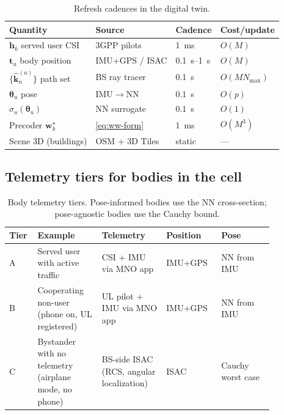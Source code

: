 \documentclass[journal,twoside,onecolumn]{IEEEtran}
\theoremstyle{definition}
\newcommand{\khat}{\hat{\bm{k}}}
\newcommand{\ww}{\mathbf{w}}
\newcommand{\hh}{\mathbf{h}}
\begin{document}
\begin{table}[!t]
\centering
\caption{Refresh cadences in the digital twin.}
\label{tab:cadence}
\begin{tabular}{@{}llll@{}}
\toprule
Quantity & Source & Cadence & Cost/update\\
\midrule
$\hh_k$ served user CSI      & 3GPP pilots    & \SI{1}{ms}   & $O(M)$\\
$\mathbf{t}_u$ body position  & IMU+GPS / ISAC & \SIrange{0.1}{1}{s} & $O(M)$\\
$\{\khat_n^{(u)}\}$ path set  & BS ray tracer  & \SI{0.1}{s}  & $O(M N_{\max})$\\
$\bm\theta_u$ pose            & IMU$\to$NN     & \SI{0.1}{s}  & $O(p)$\\
$\sigma_u(\bm\theta_u)$       & NN surrogate   & \SI{0.1}{s}  & $O(1)$\\
Precoder $\ww_k^\star$        & \eqref{eq:ww-form} & \SI{1}{ms} & $O(M^3)$\\
Scene 3D (buildings)          & OSM + 3D Tiles & static       & ---\\
\bottomrule
\end{tabular}
\end{table}

\subsection{Telemetry tiers for bodies in the cell}

\begin{table}[!t]
\centering
\caption{Body telemetry tiers. Pose-informed bodies use the NN
cross-section; pose-agnostic bodies use the Cauchy bound.}
\label{tab:tiers}
\small
\begin{tabular}{@{}p{0.06\linewidth}p{0.22\linewidth}p{0.22\linewidth}p{0.18\linewidth}p{0.18\linewidth}@{}}
\toprule
Tier & Example & Telemetry & Position & Pose\\
\midrule
A & Served user with active traffic
  & CSI + IMU via MNO app
  & IMU+GPS
  & NN from IMU\\
B & Cooperating non-user (phone on, UL registered)
  & UL pilot + IMU via MNO app
  & IMU+GPS
  & NN from IMU\\
C & Bystander with no telemetry (airplane mode, no phone)
  & BS-side ISAC (RCS, angular localization)
  & ISAC
  & Cauchy worst case\\
\bottomrule
\end{tabular}
\end{table}
\end{document}
